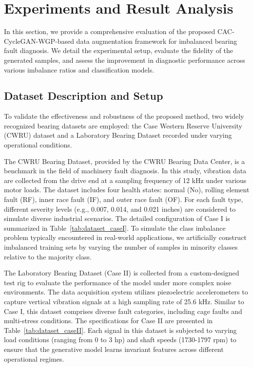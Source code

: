 \documentclass[conference,twocolumn]{IEEEtran}
\begin{document}
\section{Experiments and Result Analysis}
In this section, we provide a comprehensive evaluation of the proposed CAC-CycleGAN-WGP-based data augmentation framework for imbalanced bearing fault diagnosis. We detail the experimental setup, evaluate the fidelity of the generated samples, and assess the improvement in diagnostic performance across various imbalance ratios and classification models.

\subsection{Dataset Description and Setup}
To validate the effectiveness and robustness of the proposed method, two widely recognized bearing datasets are employed: the Case Western Reserve University (CWRU) dataset \cite{Smith2015} and a Laboratory Bearing Dataset recorded under varying operational conditions.

The CWRU Bearing Dataset, provided by the CWRU Bearing Data Center, is a benchmark in the field of machinery fault diagnosis. In this study, vibration data are collected from the drive end at a sampling frequency of 12 kHz under various motor loads. The dataset includes four health states: normal (No), rolling element fault (RF), inner race fault (IF), and outer race fault (OF). For each fault type, different severity levels (e.g., 0.007, 0.014, and 0.021 inches) are considered to simulate diverse industrial scenarios. The detailed configuration of Case I is summarized in  Table~\ref{tab:dataset_caseI}. To simulate the class imbalance problem typically encountered in real-world applications, we artificially construct imbalanced training sets by varying the number of samples in minority classes relative to the majority class.

The Laboratory Bearing Dataset (Case II) is collected from a custom-designed test rig to evaluate the performance of the model under more complex noise environments. The data acquisition system utilizes piezoelectric accelerometers to capture vertical vibration signals at a high sampling rate of 25.6 kHz. Similar to Case I, this dataset comprises diverse fault categories, including cage faults and multi-stress conditions. The specifications for Case II are presented in  Table~\ref{tab:dataset_caseII}. Each signal in this dataset is subjected to varying load conditions (ranging from 0 to 3 hp) and shaft speeds (1730-1797 rpm) to ensure that the generative model learns invariant features across different operational regimes.
\end{document}
